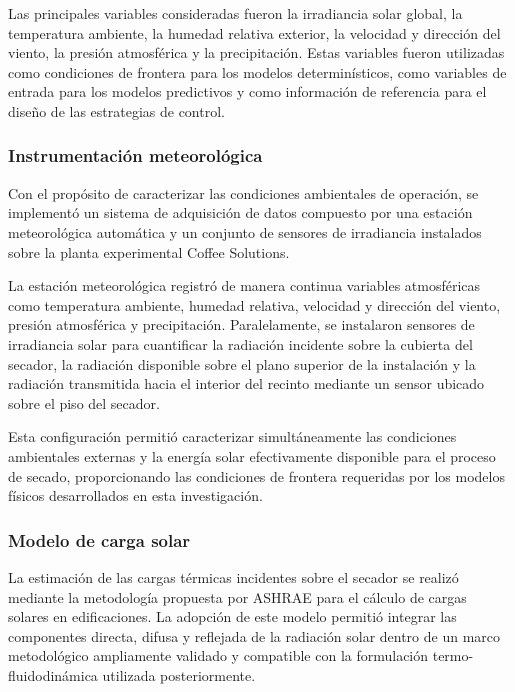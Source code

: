 Las principales variables consideradas fueron la irradiancia solar global, la temperatura ambiente, la humedad relativa exterior, la velocidad y dirección del viento, la presión atmosférica y la precipitación. Estas variables fueron utilizadas como condiciones de frontera para los modelos determinísticos, como variables de entrada para los modelos predictivos y como información de referencia para el diseño de las estrategias de control.

\subsubsection{Instrumentación meteorológica}

Con el propósito de caracterizar las condiciones ambientales de operación, se implementó un sistema de adquisición de datos compuesto por una estación meteorológica automática y un conjunto de sensores de irradiancia instalados sobre la planta experimental Coffee Solutions.

La estación meteorológica registró de manera continua variables atmosféricas como temperatura ambiente, humedad relativa, velocidad y dirección del viento, presión atmosférica y precipitación. Paralelamente, se instalaron sensores de irradiancia solar para cuantificar la radiación incidente sobre la cubierta del secador, la radiación disponible sobre el plano superior de la instalación y la radiación transmitida hacia el interior del recinto mediante un sensor ubicado sobre el piso del secador.

Esta configuración permitió caracterizar simultáneamente las condiciones ambientales externas y la energía solar efectivamente disponible para el proceso de secado, proporcionando las condiciones de frontera requeridas por los modelos físicos desarrollados en esta investigación.

\subsubsection{Modelo de carga solar}

La estimación de las cargas térmicas incidentes sobre el secador se realizó mediante la metodología propuesta por ASHRAE para el cálculo de cargas solares en edificaciones. La adopción de este modelo permitió integrar las componentes directa, difusa y reflejada de la radiación solar dentro de un marco metodológico ampliamente validado y compatible con la formulación termo-fluidodinámica utilizada posteriormente.

